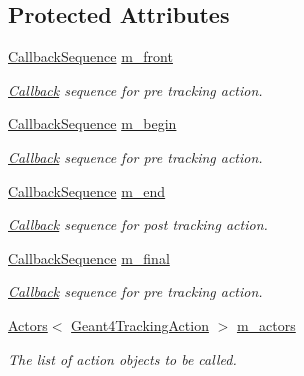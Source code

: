 \subsection*{Protected Attributes}
\begin{DoxyCompactItemize}
\item 
\hyperlink{struct_d_d4hep_1_1_callback_sequence}{CallbackSequence} \hyperlink{class_d_d4hep_1_1_simulation_1_1_geant4_tracking_action_sequence_a7d0b671eddcd31052c3b86965529e962}{m\_\-front}
\begin{DoxyCompactList}\small\item\em \hyperlink{class_d_d4hep_1_1_callback}{Callback} sequence for pre tracking action. \item\end{DoxyCompactList}\item 
\hyperlink{struct_d_d4hep_1_1_callback_sequence}{CallbackSequence} \hyperlink{class_d_d4hep_1_1_simulation_1_1_geant4_tracking_action_sequence_a60424cd706472478d3c4e2f5d78f9540}{m\_\-begin}
\begin{DoxyCompactList}\small\item\em \hyperlink{class_d_d4hep_1_1_callback}{Callback} sequence for pre tracking action. \item\end{DoxyCompactList}\item 
\hyperlink{struct_d_d4hep_1_1_callback_sequence}{CallbackSequence} \hyperlink{class_d_d4hep_1_1_simulation_1_1_geant4_tracking_action_sequence_ae7d724d09c2f2cd087d72bd448b41f79}{m\_\-end}
\begin{DoxyCompactList}\small\item\em \hyperlink{class_d_d4hep_1_1_callback}{Callback} sequence for post tracking action. \item\end{DoxyCompactList}\item 
\hyperlink{struct_d_d4hep_1_1_callback_sequence}{CallbackSequence} \hyperlink{class_d_d4hep_1_1_simulation_1_1_geant4_tracking_action_sequence_abaca2784eae1ab5e30a742819e61b3be}{m\_\-final}
\begin{DoxyCompactList}\small\item\em \hyperlink{class_d_d4hep_1_1_callback}{Callback} sequence for pre tracking action. \item\end{DoxyCompactList}\item 
\hyperlink{class_d_d4hep_1_1_simulation_1_1_geant4_action_1_1_actors}{Actors}$<$ \hyperlink{class_d_d4hep_1_1_simulation_1_1_geant4_tracking_action}{Geant4TrackingAction} $>$ \hyperlink{class_d_d4hep_1_1_simulation_1_1_geant4_tracking_action_sequence_a198136b8ba82d7de2c4d94e631b79970}{m\_\-actors}
\begin{DoxyCompactList}\small\item\em The list of action objects to be called. \item\end{DoxyCompactList}\end{DoxyCompactItemize}


